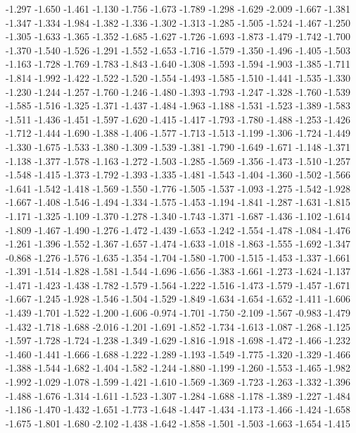 \documentclass[9pt]{article}
\theoremstyle{plain}
\theoremstyle{definition}
\theoremstyle{remark}
\numberwithin{equation}{section}
\begin{document}
-1.297
-1.650
-1.461
-1.130
-1.756
-1.673
-1.789
-1.298
-1.629
-2.009
-1.667
-1.381
-1.347
-1.334
-1.984
-1.382
-1.336
-1.302
-1.313
-1.285
-1.505
-1.524
-1.467
-1.250
-1.305
-1.633
-1.365
-1.352
-1.685
-1.627
-1.726
-1.693
-1.873
-1.479
-1.742
-1.700
-1.370
-1.540
-1.526
-1.291
-1.552
-1.653
-1.716
-1.579
-1.350
-1.496
-1.405
-1.503
-1.163
-1.728
-1.769
-1.783
-1.843
-1.640
-1.308
-1.593
-1.594
-1.903
-1.385
-1.711
-1.814
-1.992
-1.422
-1.522
-1.520
-1.554
-1.493
-1.585
-1.510
-1.441
-1.535
-1.330
-1.230
-1.244
-1.257
-1.760
-1.246
-1.480
-1.393
-1.793
-1.247
-1.328
-1.760
-1.539
-1.585
-1.516
-1.325
-1.371
-1.437
-1.484
-1.963
-1.188
-1.531
-1.523
-1.389
-1.583
-1.511
-1.436
-1.451
-1.597
-1.620
-1.415
-1.417
-1.793
-1.780
-1.488
-1.253
-1.426
-1.712
-1.444
-1.690
-1.388
-1.406
-1.577
-1.713
-1.513
-1.199
-1.306
-1.724
-1.449
-1.330
-1.675
-1.533
-1.380
-1.309
-1.539
-1.381
-1.790
-1.649
-1.671
-1.148
-1.371
-1.138
-1.377
-1.578
-1.163
-1.272
-1.503
-1.285
-1.569
-1.356
-1.473
-1.510
-1.257
-1.548
-1.415
-1.373
-1.792
-1.393
-1.335
-1.481
-1.543
-1.404
-1.360
-1.502
-1.566
-1.641
-1.542
-1.418
-1.569
-1.550
-1.776
-1.505
-1.537
-1.093
-1.275
-1.542
-1.928
-1.667
-1.408
-1.546
-1.494
-1.334
-1.575
-1.453
-1.194
-1.841
-1.287
-1.631
-1.815
-1.171
-1.325
-1.109
-1.370
-1.278
-1.340
-1.743
-1.371
-1.687
-1.436
-1.102
-1.614
-1.809
-1.467
-1.490
-1.276
-1.472
-1.439
-1.653
-1.242
-1.554
-1.478
-1.084
-1.476
-1.261
-1.396
-1.552
-1.367
-1.657
-1.474
-1.633
-1.018
-1.863
-1.555
-1.692
-1.347
-0.868
-1.276
-1.576
-1.635
-1.354
-1.704
-1.580
-1.700
-1.515
-1.453
-1.337
-1.661
-1.391
-1.514
-1.828
-1.581
-1.544
-1.696
-1.656
-1.383
-1.661
-1.273
-1.624
-1.137
-1.471
-1.423
-1.438
-1.782
-1.579
-1.564
-1.222
-1.516
-1.473
-1.579
-1.457
-1.671
-1.667
-1.245
-1.928
-1.546
-1.504
-1.529
-1.849
-1.634
-1.654
-1.652
-1.411
-1.606
-1.439
-1.701
-1.522
-1.200
-1.606
-0.974
-1.701
-1.750
-2.109
-1.567
-0.983
-1.479
-1.432
-1.718
-1.688
-2.016
-1.201
-1.691
-1.852
-1.734
-1.613
-1.087
-1.268
-1.125
-1.597
-1.728
-1.724
-1.238
-1.349
-1.629
-1.816
-1.918
-1.698
-1.472
-1.466
-1.232
-1.460
-1.441
-1.666
-1.688
-1.222
-1.289
-1.193
-1.549
-1.775
-1.320
-1.329
-1.466
-1.388
-1.544
-1.682
-1.404
-1.582
-1.244
-1.880
-1.199
-1.260
-1.553
-1.465
-1.982
-1.992
-1.029
-1.078
-1.599
-1.421
-1.610
-1.569
-1.369
-1.723
-1.263
-1.332
-1.396
-1.488
-1.676
-1.314
-1.611
-1.523
-1.307
-1.284
-1.688
-1.178
-1.389
-1.227
-1.484
-1.186
-1.470
-1.432
-1.651
-1.773
-1.648
-1.447
-1.434
-1.173
-1.466
-1.424
-1.658
-1.675
-1.801
-1.680
-2.102
-1.438
-1.642
-1.858
-1.501
-1.503
-1.663
-1.654
-1.415
\end{document}
